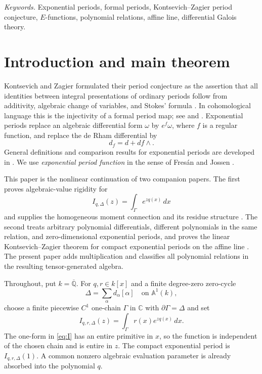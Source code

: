 \documentclass[11pt]{article}
\numberwithin{equation}{section}
\theoremstyle{definition}
\theoremstyle{remark}
\newcommand{\C}{\mathbb C}
\newcommand{\Qbar}{\overline{\mathbb Q}}
\newcommand{\Aone}{\mathbb A^1}
\begin{document}
\noindent\textit{Keywords.}
Exponential periods, formal periods, Kontsevich--Zagier period conjecture,
$E$-functions, polynomial relations, affine line, differential Galois theory.

\section{Introduction and main theorem}\label{sec:introduction}

Kontsevich and Zagier formulated their period conjecture as the assertion that
all identities between integral presentations of ordinary periods follow from
additivity, algebraic change of variables, and Stokes' formula
\cite{KontsevichZagier}.  In cohomological language this is the injectivity of
a formal period map; see \cite[Chapters~12--13]{HuberMullerStach} and
\cite{CressonViuSos}.  Exponential periods replace an algebraic differential
form $\omega$ by $e^f\omega$, where $f$ is a regular function, and replace the
de Rham differential by
\[
  d_f=d+df\wedge.
\]
General definitions and comparison results for exponential periods are
developed in \cite{CommelinHabeggerHuber}.  We use \emph{exponential period
function} in the sense of Fres\'an and Jossen \cite{FresanJossen}.

This paper is the nonlinear continuation of two companion papers.  The first
proves algebraic-value rigidity for
\[
  I_{q,\Delta}(z)=\int_\Gamma e^{zq(x)}\,dx
\]
and supplies the homogeneous moment connection and its residue structure
\cite{LongEIT}.  The second treats arbitrary polynomial differentials,
different polynomials in the same relation, and zero-dimensional exponential
periods, and proves the linear Kontsevich--Zagier theorem for compact
exponential periods on the affine line \cite{LongLinearKZ}.  The present paper
adds multiplication and classifies all polynomial relations in the resulting
tensor-generated algebra.

Throughout, put $k=\Qbar$.  For $q,r\in k[x]$ and a finite degree-zero
zero-cycle
\[
  \Delta=\sum_{\alpha}d_\alpha[\alpha]
  \quad\text{on }\Aone(k),
\]
choose a finite piecewise $C^1$ one-chain $\Gamma$ in $\C$ with
$\partial\Gamma=\Delta$ and set
\begin{equation}\label{eq:I}
  I_{q,r,\Delta}(z)=\int_\Gamma r(x)e^{zq(x)}\,dx.
\end{equation}
The one-form in \eqref{eq:I} has an entire primitive in $x$, so the function
is independent of the chosen chain and is entire in $z$.  The compact
exponential period is $I_{q,r,\Delta}(1)$.  A common nonzero algebraic
evaluation parameter is already absorbed into the polynomial $q$.
\end{document}

